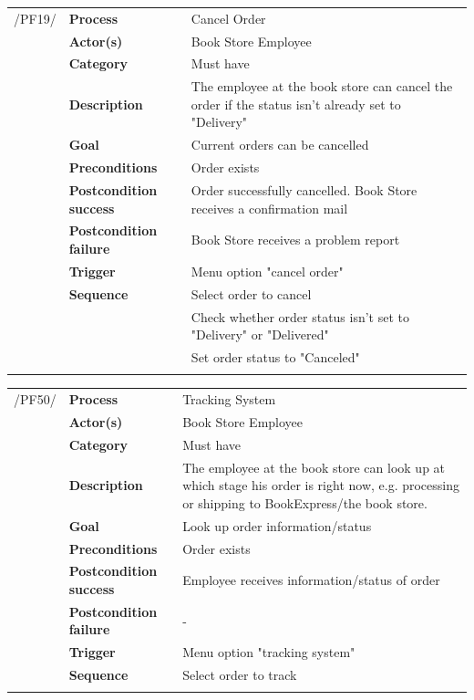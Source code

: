 \documentclass[11pt,a4paper,oneside,svgnames]{report}
\begin{document}
\noindent
\begin{tabular}{p{1.5cm}p{3cm}p{8cm}}
\cellcolor{white}/PF19/	& \textbf{Process} & Cancel Order\\
\cellcolor{white}		& \textbf{Actor(s)} & Book Store Employee\\
\cellcolor{white}		& \textbf{Category} & Must have\\
\cellcolor{white}		& \textbf{Description}	 & The employee at the book store can cancel the order if the status isn't already set to "Delivery"\\
\cellcolor{white}		& \textbf{Goal} & Current orders can be cancelled\\
\cellcolor{white}		& \textbf{Preconditions} & Order exists\\
\cellcolor{white}		& \textbf{Postcondition success} & Order successfully cancelled. Book Store receives a confirmation mail\\
\cellcolor{white}		& \textbf{Postcondition failure} & Book Store receives a problem report\\
\cellcolor{white}		& \textbf{Trigger} & Menu option "cancel order"\\
\cellcolor{white}		& \textbf{Sequence} & Select order to cancel\\
\cellcolor{white}		& & Check whether order status isn't set to "Delivery" or "Delivered"\\
\cellcolor{white}		& & Set order status to "Canceled"\\
\cellcolor{white}\hfill \\
\end{tabular}

\noindent
\begin{tabular}{p{1.5cm}p{3cm}p{8cm}}
\cellcolor{white}/PF50/	& \textbf{Process} & Tracking System\\
\cellcolor{white}		& \textbf{Actor(s)} & Book Store Employee\\
\cellcolor{white}		& \textbf{Category} & Must have\\
\cellcolor{white}		& \textbf{Description}	 & The employee at the book store can look up at which stage his order is right now, e.g. processing or shipping to BookExpress/the book store.\\
\cellcolor{white}		& \textbf{Goal} & Look up order information/status\\
\cellcolor{white}		& \textbf{Preconditions} & Order exists\\
\cellcolor{white}		& \textbf{Postcondition success} & Employee receives information/status of order\\
\cellcolor{white}		& \textbf{Postcondition failure} & -\\
\cellcolor{white}		& \textbf{Trigger} & Menu option "tracking system"\\
\cellcolor{white}		& \textbf{Sequence} & Select order to track\\
\cellcolor{white}\hfill \\
\end{tabular}
\end{document}
